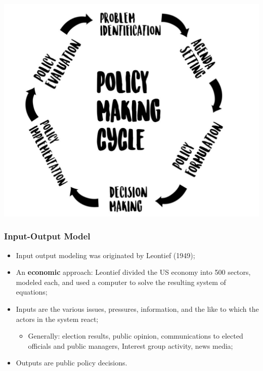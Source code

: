 \documentclass[aspectratio=169]{beamer}
\theoremstyle{principle}
\begin{document}

\begin{frame}
    \begin{center}
     \includegraphics[scale=0.4]{policy_process.png}
     \end{center}
\end{frame}

\begin{frame}
\frametitle{Input-Output Model}

\begin{itemize}
\item Input output modeling was originated by Leontief (1949);
\bigskip
\item  An \textbf{economic} approach: Leontief divided the US economy into 500 sectors, modeled each, and used a computer to solve the resulting system of equations;
\bigskip
\item Inputs are the various issues, pressures, information, and the like to which the actors in the system react;
\begin{itemize}
\item Generally: election results, public opinion, communications to elected officials and public managers, Interest group activity, news media;
\end{itemize}
\bigskip
\item Outputs are public policy decisions.%
\end{itemize}
\end{frame}
\end{document}

